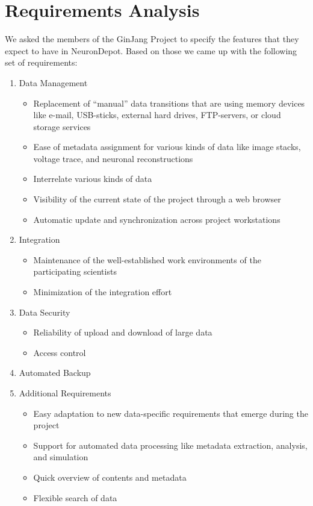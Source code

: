 \documentclass{frontiersSCNS} %
\begin{document}
\section{Requirements Analysis}
We asked the members of the GinJang Project to specify the features that they
expect to have in NeuronDepot. Based on those we came up with the following set
of requirements:
\begin{enumerate}
\item Data Management
    \begin{itemize}
    \item Replacement of ``manual'' data transitions that are using memory
        devices like e-mail, USB-sticks, external hard drives, FTP-servers, or
        cloud storage services
    \item Ease of metadata assignment for various kinds of data like image
        stacks, voltage trace, and neuronal reconstructions
    \item Interrelate various kinds of data
    \item Visibility of the current state of the project through a web browser
    \item Automatic update and synchronization across project workstations
    \end{itemize}
\item Integration
    \begin{itemize}
    \item Maintenance of the well-established work environments of the participating scientists
    \item Minimization of the integration effort
    \end{itemize}
\item Data Security
    \begin{itemize}
    \item Reliability of upload and download of large data
    \item Access control
    \end{itemize}
\item Automated Backup
\item Additional Requirements
    \begin{itemize}
    \item Easy adaptation to new data-specific requirements that emerge during
        the project
    \item Support for automated data processing like metadata extraction,
        analysis, and simulation
    \item Quick overview of contents and metadata
    \item Flexible search of data
    \end{itemize}
\end{enumerate}
\end{document}
